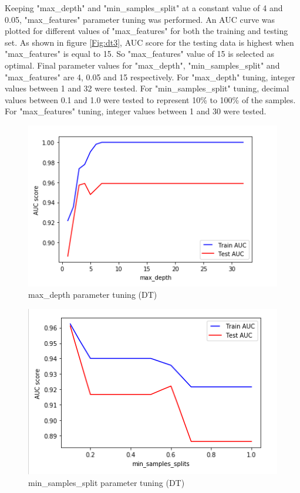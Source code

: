 \documentclass[journal]{IEEEtran}
\begin{document}
Keeping  "max\_depth"  and  "min\_samples\_split"  at a constant value of 4 and 0.05,  "max\_features" parameter tuning was performed. An AUC curve was plotted for different values of "max\_features"  for both the training and testing set. As shown in figure \ref{Fig:dt3}, AUC score for the testing data is highest when "max\_features" is equal to 15. So "max\_features"  value of 15 is selected as optimal. Final parameter values for "max\_depth", "min\_samples\_split" and  "max\_features"  are 4, 0.05 and 15 respectively. For "max\_depth" tuning, integer values between 1 and 32 were tested. For  "min\_samples\_split" tuning, decimal values between 0.1 and 1.0 were tested to represent 10\% to 100\% of the samples. For "max\_features" tuning, integer values between 1 and 30 were tested.

\begin{figure}[htbp]
	\centering
	\includegraphics[width=\linewidth]{maxDepth_DT.png}
	\caption{max\_depth parameter tuning (DT)}
	\label{Fig:dt1}
\end{figure}

\begin{figure}[htbp]
	\centering
	\includegraphics[width=\linewidth]{minSsplit_DT.png}
	\caption{min\_samples\_split parameter tuning (DT)}
	\label{Fig:dt2}
\end{figure}
\end{document}
